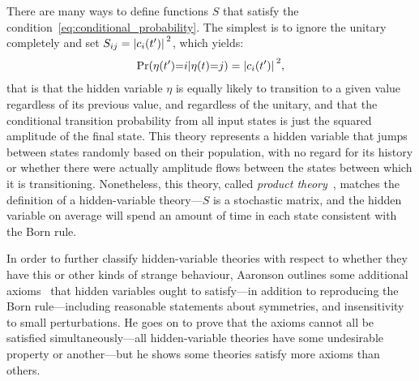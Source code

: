 There are many ways to define functions $S$ that satisfy the condition~\eqref{eq:conditional_probability}. The simplest is to ignore the unitary completely and set $S_{ij} = \abs{c_i(t^\prime)}^2$, which yields:
\begin{align}
\Pr(\eta(t^\prime){=}i|\eta(t){=}j) = \abs{c_{i}(t^\prime)}^2,
\end{align}
that is that the hidden variable $\eta$ is equally likely to transition to a given value regardless of its previous value, and regardless of the unitary, and that the conditional transition probability from all input states is just the squared amplitude of the final state. This theory represents a hidden variable that jumps between states randomly based on their population, with no regard for its history or whether there were actually amplitude flows between the states between which it is transitioning. Nonetheless, this theory, called \emph{product theory}~\cite{PhysRevA.71.032325}, matches the definition of a hidden-variable theory---$S$ is a stochastic matrix, and the hidden variable on average will spend an amount of time in each state consistent with the Born rule.

In order to further classify hidden-variable theories with respect to whether they have this or other kinds of strange behaviour, Aaronson outlines some additional axioms~\cite{PhysRevA.71.032325} that hidden variables ought to satisfy---in addition to reproducing the Born rule---including reasonable statements about symmetries, and insensitivity to small perturbations. He goes on to prove that the axioms cannot all be satisfied simultaneously---all hidden-variable theories have some undesirable property or another---but he shows some theories satisfy more axioms than others.

